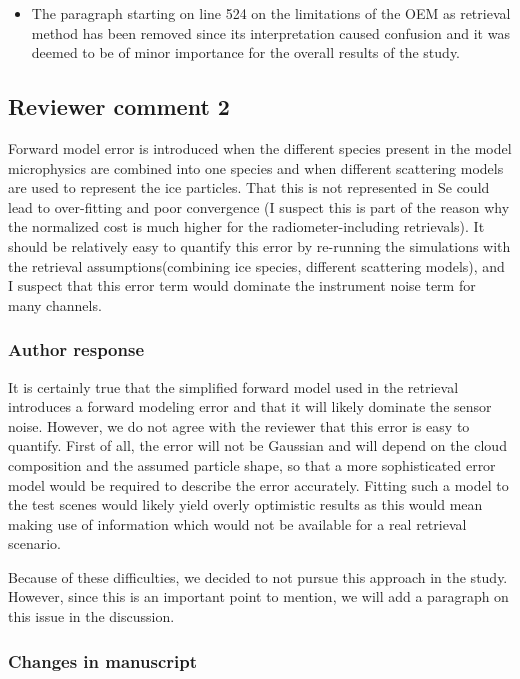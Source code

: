 \begin{itemize}
\item The paragraph starting on line 524 on the limitations of the OEM as
  retrieval method has been removed since its interpretation caused confusion
  and it was deemed to be of minor importance for the overall results of the study.
  \end{itemize}

\subsection*{Reviewer comment 2}

Forward model error is introduced when the different species present in the
model microphysics are combined into one species and when different scattering
models are used to represent the ice particles. That this is not represented in
Se could lead to over-fitting and poor convergence (I suspect this is part of
the reason why the normalized cost is much higher for the radiometer-including
retrievals). It should be relatively easy to quantify this error by re-running
the simulations with the retrieval assumptions(combining ice species, different
scattering models), and I suspect that this error term would dominate the
instrument noise term for many channels.

\subsubsection*{Author response}

It is certainly true that the simplified forward model used in the retrieval
introduces a forward modeling error and that it will likely dominate the sensor
noise. However, we do not agree with the reviewer that this error is easy to
quantify. First of all, the error will not be Gaussian and will depend on the
cloud composition and the assumed particle shape, so that a more sophisticated
error model would be required to describe the error accurately. Fitting such a
model to the test scenes would likely yield overly optimistic results as this
would mean making use of information which would not be available
for a real retrieval scenario.

Because of these difficulties, we decided to not pursue this approach in the
study. However, since this is an important point to mention, we will add a
paragraph on this issue in the discussion.

\subsubsection*{Changes in manuscript}

